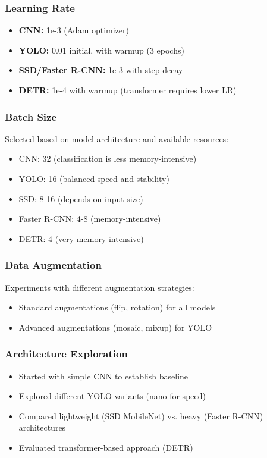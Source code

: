 \documentclass[12pt,a4paper]{article}
\begin{document}
\subsubsection{Learning Rate}

\begin{itemize}
    \item \textbf{CNN:} 1e-3 (Adam optimizer)
    \item \textbf{YOLO:} 0.01 initial, with warmup (3 epochs)
    \item \textbf{SSD/Faster R-CNN:} 1e-3 with step decay
    \item \textbf{DETR:} 1e-4 with warmup (transformer requires lower LR)
\end{itemize}

\subsubsection{Batch Size}

Selected based on model architecture and available resources:
\begin{itemize}
    \item CNN: 32 (classification is less memory-intensive)
    \item YOLO: 16 (balanced speed and stability)
    \item SSD: 8-16 (depends on input size)
    \item Faster R-CNN: 4-8 (memory-intensive)
    \item DETR: 4 (very memory-intensive)
\end{itemize}

\subsubsection{Data Augmentation}

Experiments with different augmentation strategies:
\begin{itemize}
    \item Standard augmentations (flip, rotation) for all models
    \item Advanced augmentations (mosaic, mixup) for YOLO
\end{itemize}

\subsubsection{Architecture Exploration}

\begin{itemize}
    \item Started with simple CNN to establish baseline
    \item Explored different YOLO variants (nano for speed)
    \item Compared lightweight (SSD MobileNet) vs. heavy (Faster R-CNN) architectures
    \item Evaluated transformer-based approach (DETR)
\end{itemize}
\end{document}
